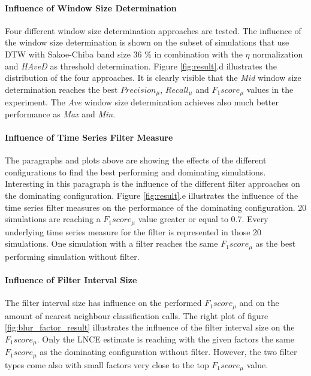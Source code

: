 \paragraph{Influence of Window Size Determination} Four different window size determination approaches are tested. The
influence of the window size determination is shown on the subset of simulations that use DTW with Sakoe-Chiba band size
36 \% in combination with the $\eta$ normalization and \textit{HAveD} as threshold determination. Figure
\ref{fig:result}.d illustrates the distribution of the four approaches. It is clearly visible that the
\textit{Mid} window size determination reaches the best $Precision_{\mu}$, $Recall_{\mu}$ and $F_{1}score_{\mu}$
values in the experiment. The \textit{Ave} window size determination achieves also much better performance as
\textit{Max} and \textit{Min}.

\paragraph{Influence of Time Series Filter Measure} The paragraphs and plots above are showing the effects of the
different configurations to find the best performing and dominating simulations. Interesting in this paragraph is the
influence of the different filter approaches on the dominating configuration. Figure \ref{fig:result}.e illustrates the
influence of the time series filter measures on the performance
of the dominating configuration. 20 simulations are reaching a $F_{1}score_{\mu}$ value greater or equal to 0.7. Every
underlying time series measure for the filter is represented in those 20 simulations. One simulation with a filter
reaches the same $F_{1}score_{\mu}$ as the best performing simulation without filter.

\paragraph{Influence of Filter Interval Size} The filter interval size has influence on the performed
$F_{1}score_{\mu}$ and on the amount of nearest neighbour classification calls. The right plot of figure
\ref{fig:blur_factor_result} illustrates the influence of the filter interval size on the $F_{1}score_{\mu}$. Only the
LNCE estimate is reaching with the given factors the same $F_{1}score_{\mu}$ as the dominating configuration without
filter. However, the two filter types come also with small factors very close to the top $F_{1}score_{\mu}$ value.

